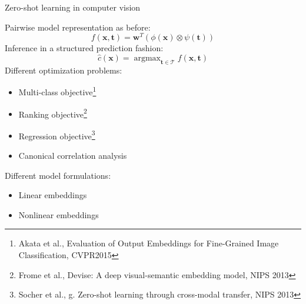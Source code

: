 \documentclass[]{beamer}
\renewcommand{\vec}[1]{\boldsymbol{#1}}
\DeclareMathOperator*{\argmax}{\arg \max}
\begin{document}
\begin{frame}{Zero-shot learning in computer vision}

\vspace{0.5cm}
Pairwise model representation as before: 
\begin{equation*}
\label{eq:pairwise}
f(\vec{x},\vec{t}) = \vec{w}^T \left(\phi(\vec{x}) \otimes \psi(\vec{t}) \right) 
\end{equation*}
Inference in a structured prediction fashion: 
$$\hat{c}(\vec{x}) = \argmax_{\vec{t} \in \mathcal{T}} f(\vec{x},\vec{t})$$
Different optimization problems: 
\begin{itemize}
\item Multi-class objective\footnote{Akata et al., Evaluation of Output Embeddings for Fine-Grained Image Classification, CVPR2015}
\item Ranking objective\footnote{Frome et al., Devise: A deep visual-semantic embedding
model, NIPS 2013}
\item Regression objective\footnote{Socher et al., g. Zero-shot learning through cross-modal transfer, NIPS 2013}
\item Canonical correlation analysis
\end{itemize}
Different model formulations: 
\begin{itemize}
\item Linear embeddings
\item Nonlinear embeddings
\end{itemize}
\vspace{0.3cm}
\end{frame}
\end{document}
